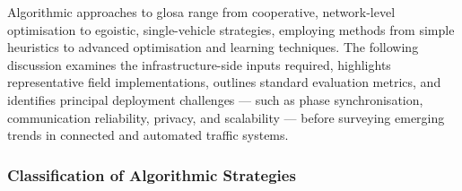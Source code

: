 Algorithmic approaches to \ac{glosa} range from cooperative, network-level optimisation to egoistic, single-vehicle strategies, employing methods from simple heuristics to advanced optimisation and learning techniques. The following discussion examines the infrastructure-side inputs required, highlights representative field implementations, outlines standard evaluation metrics, and identifies principal deployment challenges --- such as phase synchronisation, communication reliability, privacy, and scalability --- before surveying emerging trends in connected and automated traffic systems.

\subsubsection{Classification of Algorithmic Strategies}
\label{subsubsec:classification_algorithms}

